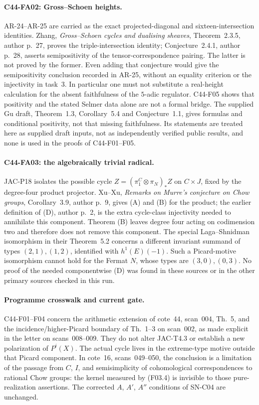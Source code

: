 \paragraph{C44-FA02: Gross--Schoen heights.}
AR-24--AR-25 are carried as the exact projected-diagonal and
sixteen-intersection identities.  Zhang,
\emph{Gross--Schoen cycles and dualising sheaves},
Theorem~2.3.5, author p.~27, proves the triple-intersection
identity; Conjecture~2.4.1, author p.~28, asserts semipositivity
of the tensor-correspondence pairing.  The latter is not proved
by the former.  Even adding that conjecture would give the
semipositivity conclusion recorded in AR-25, without an
equality criterion or the injectivity in task~3.  In particular
one must not substitute a real-height calculation for
the absent faithfulness of the $5$-adic regulator.  C44-F05
shows that positivity and the stated Selmer data alone are not
a formal bridge.  The supplied Gu draft, Theorem~1.3,
Corollary~5.4 and Conjecture~1.1, gives formulas and
conditional positivity, not that missing faithfulness.  Its
statements are treated here as supplied draft inputs, not as
independently verified public results, and none is used in the
proofs of C44-F01--F05.

\paragraph{C44-FA03: the algebraically trivial radical.}
JAC-P18 isolates the possible cycle
$Z=(\pi_1^C\otimes\pi_N)_*Z$ on $C\times J$, fixed by the
degree-four product projector.  Xu--Xu,
\emph{Remarks on Murre's conjecture on Chow groups},
Corollary~3.9, author p.~9, gives (A) and (B) for the product;
the earlier definition of (D), author p.~2, is the extra
cycle-class injectivity needed to annihilate this component.
Theorem (B) leaves degree four acting on codimension two and
therefore does not remove this component.  The special
Laga--Shnidman isomorphism in their Theorem~5.2 concerns a
different invariant summand of types $(2,1),(1,2)$, identified
with $h^1(E)(-1)$.  Such a Picard-motive isomorphism cannot hold
for the Fermat $N$, whose types are $(3,0),(0,3)$.
No proof of the needed componentwise (D) was found in these
sources or in the other primary sources checked in this run.

\paragraph{Programme crosswalk and current gate.}
C44-F01--F04 concern the arithmetic extension of cote~44,
scan~004, Th.~5, and the incidence/higher-Picard boundary of
Th.~1--3 on scan~002, as made explicit in the letter on
scans~008--009.  They do not alter JAC-T4.3 or establish a new
polarization of $P^i(X)$.  The actual cycle lives in the
extreme-type motive outside that Picard component.
In cote~16, scans~049--050, the conclusion is a limitation of
the passage from $C$, $I$, and semisimplicity of cohomological
correspondences to rational Chow groups: the kernel measured
by (F03.4) is invisible to those pure-realization assertions.
The corrected $A$, $A'$, $A''$ conditions of SN-C04 are
unchanged.

